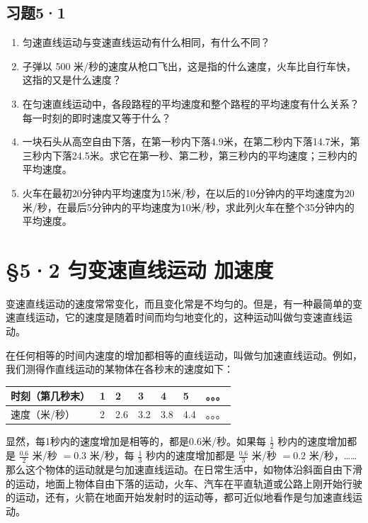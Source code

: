 \subsection{习题5·1}\label{ux4e60ux989851}

\begin{enumerate}
\def\labelenumi{\arabic{enumi}.}
\item
  匀速直线运动与变速直线运动有什么相同，有什么不同？
\item
  子弹以 500
  米/秒的速度从枪口飞出，这是指的什么速度，火车比自行车快，这指的又是什么速度？
\item
  在匀速直线运动中，各段路程的平均速度和整个路程的平均速度有什么关系？每一时刻的即时速度又等于什么？
\item
  一块石头从高空自由下落，在第一秒内下落4.9米，在第二秒内下落14.7米，第三秒内下落24.5米。求它在第一秒、第二秒，第三秒内的平均速度；三秒内的平均速度。
\item
  火车在最初20分钟内平均速度为15米/秒，在以后的10分钟内的平均速度为20米/秒，在最后5分钟内的平均速度为10米/秒，求此列火车在整个35分钟内的平均速度。
\end{enumerate}

\section{§5·2 匀变速直线运动
加速度}\label{ux5300ux53d8ux901fux76f4ux7ebfux8fd0ux52a8-ux52a0ux901fux5ea6}

变速直线运动的速度常常变化，而且变化常是不均匀的。但是，有一种最简单的变速直线运动，它的速度是随着时间而均匀地变化的，这种运动叫做匀变速直线运动。

在任何相等的时间内速度的增加都相等的直线运动，叫做匀加速直线运动。例如，我们测得作直线运动的某物体在各秒末的速度如下：

{\def\LTcaptype{none} %
\begin{longtable}[]{@{}lllllll@{}}
\toprule\noalign{}
时刻（第几秒末） & 1 & 2 & 3 & 4 & 5 & 。。。 \\
\midrule\noalign{}
\endhead
\bottomrule\noalign{}
\endlastfoot
速度（米/秒） & 2 & 2.6 & 3.2 & 3.8 & 4.4 & 。。。 \\
\end{longtable}
}

显然，每1秒内的速度增加是相等的，都是0.6米/秒。如果每 \(\frac{1}{2}\)
秒内的速度增加都是 \(\frac{0.6}{2}\) 米/秒 \(= 0.3\) 米/秒，每
\(\frac{1}{3}\) 秒内的速度增加都是 \(\frac{0.6}{3}\) 米/秒 \(= 0.2\)
米/秒，\ldots\ldots 那么这个物体的运动就是匀加速直线运动。在日常生活中，如物体沿斜面自由下滑的运动，地面上物体自由下落的运动，火车、汽车在平直轨道或公路上刚开始行驶的运动，还有，火箭在地面开始发射时的运动等，都可近似地看作是匀加速直线运动。

